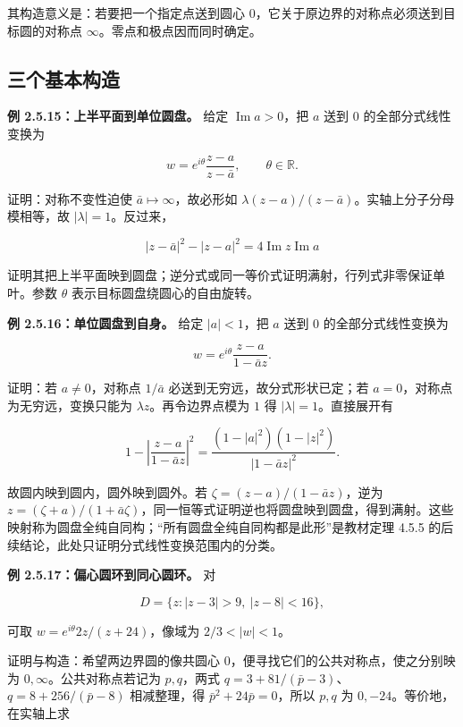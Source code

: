 \documentclass[11pt,a4paper]{article}
\begin{document}
其构造意义是：若要把一个指定点送到圆心
\(0\)，它关于原边界的对称点必须送到目标圆的对称点
\(\infty\)。零点和极点因而同时确定。

\subsection{三个基本构造}\label{ch02-s5-ux4e09ux4e2aux57faux672cux6784ux9020}

\textbf{例 2.5.15：上半平面到单位圆盘。} 给定
\(\operatorname{Im}a>0\)，把 \(a\) 送到 \(0\) 的全部分式线性变换为

\[
w=e^{i\theta}\frac{z-a}{z-\bar a},\qquad\theta\in\mathbb R.
\]

证明：对称不变性迫使 \(\bar a\mapsto\infty\)，故必形如
\(\lambda(z-a)/(z-\bar a)\)。实轴上分子分母模相等，故
\(|\lambda|=1\)。反过来，

\[
|z-\bar a|^2-|z-a|^2=4\operatorname{Im}z\operatorname{Im}a
\]

证明其把上半平面映到圆盘；逆分式或同一等价式证明满射，行列式非零保证单叶。参数
\(\theta\) 表示目标圆盘绕圆心的自由旋转。

\textbf{例 2.5.16：单位圆盘到自身。} 给定 \(|a|<1\)，把 \(a\) 送到 \(0\)
的全部分式线性变换为

\[
w=e^{i\theta}\frac{z-a}{1-\bar a z}.
\]

证明：若 \(a\ne0\)，对称点 \(1/\bar a\) 必送到无穷远，故分式形状已定；若
\(a=0\)，对称点为无穷远，变换只能为 \(\lambda z\)。再令边界点模为 \(1\)
得 \(|\lambda|=1\)。直接展开有

\[
1-\left|\frac{z-a}{1-\bar a z}\right|^2
=\frac{(1-|a|^2)(1-|z|^2)}{|1-\bar a z|^2}.
\]

故圆内映到圆内，圆外映到圆外。若 \(\zeta=(z-a)/(1-\bar a z)\)，逆为
\(z=(\zeta+a)/(1+\bar a\zeta)\)，同一恒等式证明逆也将圆盘映到圆盘，得到满射。这些映射称为圆盘全纯自同构；``所有圆盘全纯自同构都是此形''是教材定理
4.5.5 的后续结论，此处只证明分式线性变换范围内的分类。

\textbf{例 2.5.17：偏心圆环到同心圆环。} 对

\[
D=\{z:|z-3|>9,\ |z-8|<16\},
\]

可取 \(w=e^{i\theta}2z/(z+24)\)，像域为 \(2/3<|w|<1\)。

证明与构造：希望两边界圆的像共圆心
\(0\)，便寻找它们的公共对称点，使之分别映为
\(0,\infty\)。公共对称点若记为 \(p,q\)，两式
\(q=3+81/(\bar p-3)\)、\(q=8+256/(\bar p-8)\) 相减整理，得
\(\bar p^2+24\bar p=0\)，所以 \(p,q\) 为 \(0,-24\)。等价地，在实轴上求
\end{document}
